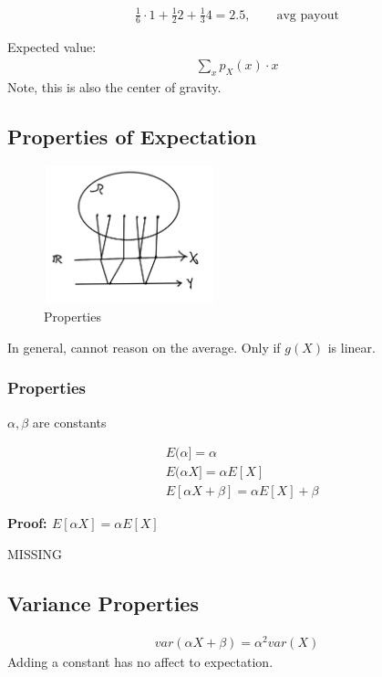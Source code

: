 \begin{align*}
\frac{1}{6}\cdot 1 + \frac{1}{2}2 + \frac{1}{3}4 = 2.5, \qquad \text{avg payout}
\end{align*}

Expected value:
\begin{align*}
\sum_x p_X(x) \cdot x
\end{align*}
Note, this is also the center of gravity.

\subsection{Properties of Expectation}


\begin{figure}[h]
\centering
\includegraphics[width=5cm, height=4cm]{images/L05/EX_properties.jpeg}
\caption{Properties}
\end{figure}

 In general, cannot reason on the average.  Only if $g(X)$ is linear.


\subsubsection{Properties}
$\alpha, \beta$ are constants

\begin{align*}
&E(\alpha] = \alpha\\
&E(\alpha X] = \alpha E[X]\\
&E[\alpha X + \beta] = \alpha E[X] + \beta
\end{align*}

\textbf{Proof: $E[\alpha X]= \alpha E[X]$}

MISSING

\subsection{Variance Properties}


\begin{align*}
var(\alpha X + \beta) = \alpha^2 var(X)
\end{align*}
Adding a constant has no affect to expectation.